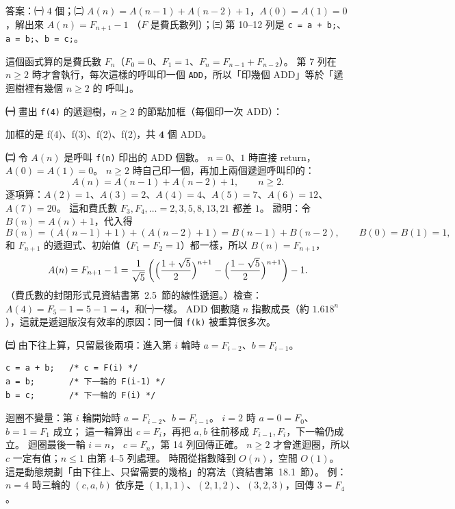 \begin{pastsoln}
答案：㈠ $4$ 個；㈡ $A(n) = A(n-1) + A(n-2) + 1$，$A(0) = A(1) = 0$，解出來 $A(n) = F_{n+1} - 1$
（$F$ 是費氏數列）；㈢ 第 10--12 列是 \texttt{c = a + b;}、\texttt{a = b;}、\texttt{b = c;}。

這個函式算的是費氏數 $F_n$（$F_0 = 0$、$F_1 = 1$、$F_n = F_{n-1} + F_{n-2}$）。 第 7 列在 $n \ge 2$
時才會執行，每次這樣的呼叫印一個 \texttt{ADD}，所以「印幾個 ADD」等於「遞迴樹裡有幾個 $n \ge 2$ 的
呼叫」。

\textbf{㈠} 畫出 \texttt{f(4)} 的遞迴樹，$n \ge 2$ 的節點加框（每個印一次 ADD）：
\begin{center}
\end{center}
加框的是 f(4)、f(3)、f(2)、f(2)，共 $\mathbf{4}$ 個 ADD。

\textbf{㈡} 令 $A(n)$ 是呼叫 \texttt{f(n)} 印出的 ADD 個數。 $n = 0$、$1$ 時直接 return，
$A(0) = A(1) = 0$。 $n \ge 2$ 時自己印一個，再加上兩個遞迴呼叫印的：
\[
A(n) = A(n-1) + A(n-2) + 1, \qquad n \ge 2.
\]
逐項算：$A(2) = 1$、$A(3) = 2$、$A(4) = 4$、$A(5) = 7$、$A(6) = 12$、$A(7) = 20$。 這和費氏數
$F_3, F_4, \ldots = 2, 3, 5, 8, 13, 21$ 都差 $1$。 證明：令 $B(n) = A(n) + 1$，代入得
\[
B(n) = (A(n-1) + 1) + (A(n-2) + 1) = B(n-1) + B(n-2),\qquad B(0) = B(1) = 1,
\]
和 $F_{n+1}$ 的遞迴式、初始值（$F_1 = F_2 = 1$）都一樣，所以 $B(n) = F_{n+1}$，
\[
A(n) = F_{n+1} - 1 = \frac{1}{\sqrt5}\left(\Bigl(\frac{1+\sqrt5}{2}\Bigr)^{n+1}
- \Bigl(\frac{1-\sqrt5}{2}\Bigr)^{n+1}\right) - 1.
\]
（費氏數的封閉形式見資結書第~2.5~節的線性遞迴。）檢查：$A(4) = F_5 - 1 = 5 - 1 = 4$，和㈠一樣。 ADD 個數隨 $n$
指數成長（約 $1.618^n$），這就是遞迴版沒有效率的原因：同一個 \texttt{f(k)} 被重算很多次。

\textbf{㈢} 由下往上算，只留最後兩項：進入第 $i$ 輪時 $a = F_{i-2}$、$b = F_{i-1}$。
\begin{verbatim}
c = a + b;   /* c = F(i) */
a = b;       /* 下一輪的 F(i-1) */
b = c;       /* 下一輪的 F(i) */
\end{verbatim}
迴圈不變量：第 $i$ 輪開始時 $a = F_{i-2}$、$b = F_{i-1}$。 $i = 2$ 時 $a = 0 = F_0$、$b = 1 = F_1$ 成立；
這一輪算出 $c = F_i$，再把 $a, b$ 往前移成 $F_{i-1}, F_i$，下一輪仍成立。 迴圈最後一輪 $i = n$，
$c = F_n$，第 14 列回傳正確。 $n \ge 2$ 才會進迴圈，所以 $c$ 一定有值；$n \le 1$ 由第 4--5 列處理。
時間從指數降到 $O(n)$，空間 $O(1)$。 這是動態規劃「由下往上、只留需要的幾格」的寫法（資結書第~18.1~節）。
例：$n = 4$ 時三輪的 $(c, a, b)$ 依序是 $(1, 1, 1)$、$(2, 1, 2)$、$(3, 2, 3)$，回傳 $3 = F_4$。
\end{pastsoln}
